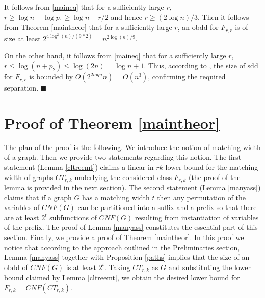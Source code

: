 \documentclass{article}
\begin{document}
It follows from \eqref{maineq} that for a sufficiently large $r$,
$r \geq \log n-\log p_1 \geq \log n-r/2$ and hence $r \geq (2\log n)/3$.
Then it follows from Theorem \ref{maintheor} that for a sufficiently
large $r$, an {\sc obdd} for $F_{r,r}$ is of size at least 
$2^{4\log^2(n)/(9*2)}=n^{2\log(n)/9}$.

On the other hand, it follows from \eqref{maineq} 
that for a sufficiently large $r$, $r \leq \log(n+p_2) \leq \log(2n)=\log n+1$.
Thus, according to \cite{SDD}, the size of {\sc sdd} for $F_{r,r}$ is bounded by
$O(2^{2log n}n)=O(n^3)$, confirming the required separation.
$\blacksquare$

\begin{comment}
Using this equality lower and upper bounds on $r$
in terms of $n$ that hold for sufficiently large $r$.
Then it follows from Theorem \ref{maintheor} that for a sufficiently
large $r$, an OBDD for $F_{r,r}$ is of size at least 
$2^{4\log^2(n)/(9*2)}=n^{2\log(n)/9}$.

On the other hand, it follows $r \leq \log(n+p_1) \leq \log(2n)=\log n+1$.


The lower bound together with Theorem \ref{maintheor} imply that for a sufficiently
large $r$, an OBDD for $F_{r,r}$ is of size at least 
$2^{4\log^2(n)/(9*2)=n^{2\log(n)/9}$.

By Lemma \ref{twf}, the treewidth of the primal graph of $F_{r,r}$ is at most
$2r-1$ which is at most $2\log n+1$ by the above upper bound.
Thus, according to \cite{SDD}, the size of {\sc sdd} for $T_{r,r}$ is bounded by
$O(2^{2log n}n)=O(n^3)$, as required. $\blacksquare$
\end{comment}

\section{Proof of Theorem \ref{maintheor}} \label{lbaux1}
The plan of the proof is the following. We introduce the notion of
matching width of a graph. Then we provide two statements regarding this
notion. The first statement (Lemma \ref{cltreemt}) claims a linear in $rk$ lower bound 
for the matching width of graphs $CT_{r,k}$ underlying the considered class
$F_{r,k}$ (the proof of the lemma is provided in the next section).
The second statement (Lemma \ref{manyass}) claims that if a graph $G$ has a matching width $t$
then any permutation of the variables of $CNF(G)$ can be partitioned into 
a suffix and a prefix so that there are at least $2^t$ subfunctions of $CNF(G)$
resulting from instantiation of variables of the prefix. The proof of Lemma \ref{manyass}
constitutes the essential part of this section. 
Finally, we provide a proof of Theorem \ref{maintheor}.
In this proof we notice that according to the approach 
outlined in the Preliminaries section, Lemma \ref{manyass} together
with Proposition \ref{paths} implies that the size of an {\sc obdd} of $CNF(G)$
is at least $2^t$. Taking $CT_{r,k}$ as $G$ and substituting the lower
bound claimed by Lemma \ref{cltreemt}, we obtain the desired lower bound for
$F_{r,k}=CNF(CT_{r,k})$. 
\end{document}
